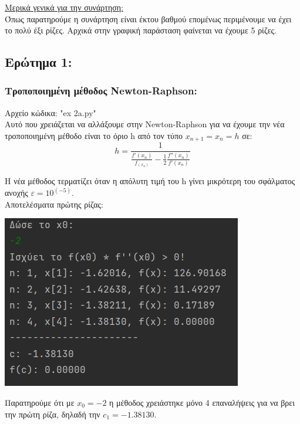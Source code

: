 \documentclass{article}
\begin{document}
\vspace{5mm} 
\large{\underline{Μερικά γενικά για την συνάρτηση: }} \\
Όπως παρατηρούμε η συνάρτηση είναι έκτου βαθμού επομένως περιμένουμε να έχει το πολύ έξι ρίζες. Αρχικά στην γραφική παράσταση φαίνεται να έχουμε 5 ρίζες.

\subsection{Ερώτημα 1:}
    \subsubsection{Τροποποιημένη μέθοδος Newton-Raphson:}
    Αρχείο κώδικα: "ex 2a.py" \\
    Αυτό που χρειάζεται να αλλάξουμε στην Newton-Raphson για να έχουμε την νέα τροποποιημένη μέθοδο είναι το όριο h από τον τύπο \(x_{n+1} = x_n = h\) σε: \\
    
    \[h = \frac{1}{\frac{f'(x_n)}{f_(x_n)} - \frac{1}{2}\frac{f''(x_n)}{f'(x_n)}}\]
    
    Η νέα μέθοδος τερματίζει όταν η απόλυτη τιμή του h γίνει μικρότερη του σφάλματος ανοχής \(ε = 10^{(-5)}\). \\
    
    Αποτελέσματα πρώτης ρίζας: \\
    \begin{center}\includegraphics[]{images/results_8.png}\end{center}
    Παρατηρούμε ότι με \(x_0 = -2\) η μέθοδος χρειάστηκε μόνο 4 επαναλήψεις για να βρει την πρώτη ρίζα, δηλαδή την \(c_1 = -1.38130\). 
    
\end{document}
